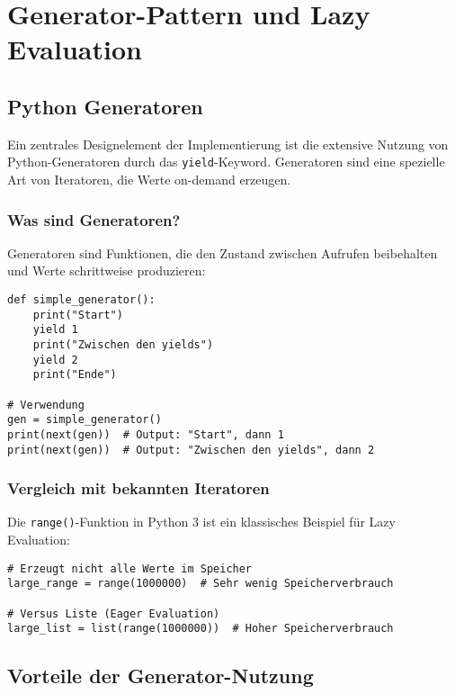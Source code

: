 \documentclass[12pt,a4paper]{article}
\begin{document}
\section{Generator-Pattern und Lazy Evaluation}

\subsection{Python Generatoren}

Ein zentrales Designelement der Implementierung ist die extensive Nutzung von Python-Generatoren durch das \texttt{yield}-Keyword. Generatoren sind eine spezielle Art von Iteratoren, die Werte on-demand erzeugen.

\subsubsection{Was sind Generatoren?}

Generatoren sind Funktionen, die den Zustand zwischen Aufrufen beibehalten und Werte schrittweise produzieren:

\begin{lstlisting}[caption={Einfaches Generator-Beispiel}]
def simple_generator():
    print("Start")
    yield 1
    print("Zwischen den yields")
    yield 2
    print("Ende")

# Verwendung
gen = simple_generator()
print(next(gen))  # Output: "Start", dann 1
print(next(gen))  # Output: "Zwischen den yields", dann 2
\end{lstlisting}

\subsubsection{Vergleich mit bekannten Iteratoren}

Die \texttt{range()}-Funktion in Python 3 ist ein klassisches Beispiel für Lazy Evaluation:

\begin{lstlisting}[caption={Range als Iterator}]
# Erzeugt nicht alle Werte im Speicher
large_range = range(1000000)  # Sehr wenig Speicherverbrauch

# Versus Liste (Eager Evaluation)
large_list = list(range(1000000))  # Hoher Speicherverbrauch
\end{lstlisting}

\subsection{Vorteile der Generator-Nutzung}
\end{document}
